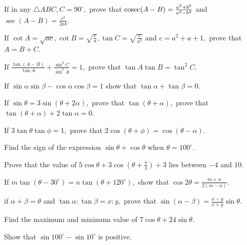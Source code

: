 \item If in any $\triangle ABC, C = 90^\circ,$ prove that ${\rm cosec}(A - B) = \frac{a^2 + b^2}{a^2 - b^2}$ and $\sec(A
    - B) = \frac{c^2}{2ab}$.

\item If $\cot A = \sqrt{ac}, \cot B = \sqrt{\frac{c}{a}}, \tan C = \sqrt{\frac{c}{a^3}}$ and $c = a^2 + a + 1,$ prove
    that $A = B + C$.

\item If $\frac{\tan(A - B)}{\tan A} + \frac{\sin^2C}{\sin^2A} = 1,$ prove that $\tan A\tan B = \tan^2 C$.

\item If $\sin\alpha\sin\beta - \cos\alpha\cos\beta = 1$ show that $\tan\alpha + \tan\beta = 0$.

\item If $\sin\theta = 3\sin(\theta + 2\alpha),$ prove that $\tan(\theta + \alpha),$ prove that $\tan(\theta +
    \alpha) + 2\tan\alpha = 0$.

\item If $3\tan\theta\tan\phi = 1,$ prove that $2\cos(\theta + \phi) = \cos(\theta - \alpha)$.

\item Find the sign of the expression $\sin\theta + \cos\theta$ when $\theta = 100^\circ$.

\item Prove that the value of $5\cos\theta + 3\cos\left(\theta + \frac{\pi}{3}\right) + 3$ lies between $-4$ and
    $10$.

\item If $m\tan(\theta - 30^\circ) = n\tan(\theta + 120^\circ),$ show that $\cos2\theta = \frac{m + n}{2(m - n)}$.

\item if $\alpha + \beta = \theta$ and $\tan\alpha:\tan\beta = x:y,$ prove that $\sin(\alpha - \beta) = \frac{x -
    y}{x + y}\sin\theta$.

\item Find the maximum and minimum value of $7\cos\theta + 24\sin\theta$.

\item Show that $\sin 100^\circ - \sin 10^\circ$ is positive.
\stopitemize